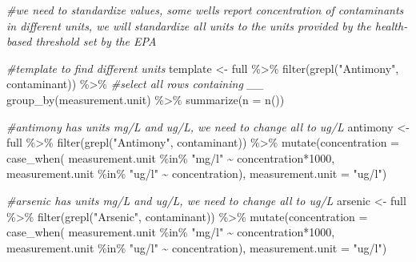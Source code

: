 \documentclass[12pt, twoside]{amherstthesis}
\newenvironment{Shaded}{\begin{snugshade}}{\end{snugshade}}
\newcommand{\AttributeTok}[1]{\textcolor[rgb]{0.77,0.63,0.00}{#1}}
\newcommand{\CommentTok}[1]{\textcolor[rgb]{0.56,0.35,0.01}{\textit{#1}}}
\newcommand{\DecValTok}[1]{\textcolor[rgb]{0.00,0.00,0.81}{#1}}
\newcommand{\FunctionTok}[1]{\textcolor[rgb]{0.00,0.00,0.00}{#1}}
\newcommand{\NormalTok}[1]{#1}
\newcommand{\OtherTok}[1]{\textcolor[rgb]{0.56,0.35,0.01}{#1}}
\newcommand{\SpecialCharTok}[1]{\textcolor[rgb]{0.00,0.00,0.00}{#1}}
\newcommand{\StringTok}[1]{\textcolor[rgb]{0.31,0.60,0.02}{#1}}
\begin{document}
\begin{Shaded}
\begin{Highlighting}[]
\CommentTok{\#we need to standardize values, some wells report concentration of contaminants in different units, we will standardize all units to the units provided by the health{-}based threshold set by the EPA}

\CommentTok{\#template to find different units}
\NormalTok{template }\OtherTok{\textless{}{-}}\NormalTok{ full }\SpecialCharTok{\%\textgreater{}\%}
  \FunctionTok{filter}\NormalTok{(}\FunctionTok{grepl}\NormalTok{(}\StringTok{"Antimony"}\NormalTok{, contaminant)) }\SpecialCharTok{\%\textgreater{}\%} \CommentTok{\#select all rows containing \_\_}
  \FunctionTok{group\_by}\NormalTok{(measurement.unit) }\SpecialCharTok{\%\textgreater{}\%}
  \FunctionTok{summarize}\NormalTok{(}\AttributeTok{n =} \FunctionTok{n}\NormalTok{())}

\CommentTok{\#antimony has units mg/L and ug/L, we need to change all to ug/L}
\NormalTok{antimony }\OtherTok{\textless{}{-}}\NormalTok{ full }\SpecialCharTok{\%\textgreater{}\%}
  \FunctionTok{filter}\NormalTok{(}\FunctionTok{grepl}\NormalTok{(}\StringTok{"Antimony"}\NormalTok{, contaminant)) }\SpecialCharTok{\%\textgreater{}\%}
  \FunctionTok{mutate}\NormalTok{(}\AttributeTok{concentration =} 
           \FunctionTok{case\_when}\NormalTok{(}
\NormalTok{             measurement.unit }\SpecialCharTok{\%in\%} \StringTok{"mg/l"} \SpecialCharTok{\textasciitilde{}}\NormalTok{ concentration}\SpecialCharTok{*}\DecValTok{1000}\NormalTok{,}
\NormalTok{             measurement.unit }\SpecialCharTok{\%in\%} \StringTok{"ug/l"} \SpecialCharTok{\textasciitilde{}}\NormalTok{ concentration),}
         \AttributeTok{measurement.unit =} \StringTok{"ug/l"}\NormalTok{)}
  
\CommentTok{\#arsenic has units mg/L and ug/L, we need to change all to ug/L}
\NormalTok{arsenic }\OtherTok{\textless{}{-}}\NormalTok{ full }\SpecialCharTok{\%\textgreater{}\%}
  \FunctionTok{filter}\NormalTok{(}\FunctionTok{grepl}\NormalTok{(}\StringTok{"Arsenic"}\NormalTok{, contaminant)) }\SpecialCharTok{\%\textgreater{}\%}
  \FunctionTok{mutate}\NormalTok{(}\AttributeTok{concentration =} 
           \FunctionTok{case\_when}\NormalTok{(}
\NormalTok{             measurement.unit }\SpecialCharTok{\%in\%} \StringTok{"mg/l"} \SpecialCharTok{\textasciitilde{}}\NormalTok{ concentration}\SpecialCharTok{*}\DecValTok{1000}\NormalTok{,}
\NormalTok{             measurement.unit }\SpecialCharTok{\%in\%} \StringTok{"ug/l"} \SpecialCharTok{\textasciitilde{}}\NormalTok{ concentration),}
         \AttributeTok{measurement.unit =} \StringTok{"ug/l"}\NormalTok{)}


\end{Highlighting}
\end{Shaded}
\end{document}
